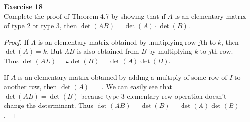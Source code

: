 \documentclass[12pt, a4paper]{article}
\theoremstyle{plain}
\newenvironment{exercise}[2][Exercise]
    { \begin{mdframed}[backgroundcolor=gray!20] \textbf{#1 #2} \\}
    {  \end{mdframed}}
\begin{document}
\begin{exercise}{18}
Complete the proof of Theorem 4.7 by showing that if $A$ is an elementary matrix of type $2$ or type $3$, then $\det(AB)=\det(A)\cdot \det(B)$.
\end{exercise}
	\begin{proof}
	If $A$ is an elementary matrix obtained by multiplying row $j$th to $k$, then $\det(A)=k$. But $AB$ is also obtained from $B$ by multiplying $k$ to $j$th row. Thus $\det(AB)=k\det(B)=\det(A)\det(B)$.
	
	If $A$ is an elementary matrix obtained by adding a multiply of some row of $I$ to another row, then $\det(A)=1$. We can easily see that $\det(AB)=\det(B)$ because type 3 elementary row operation doesn't change the determinant. Thus $\det(AB)=\det(B)=\det(A)\det(B)$.
	\end{proof}
	
\pagebreak
\end{document}

